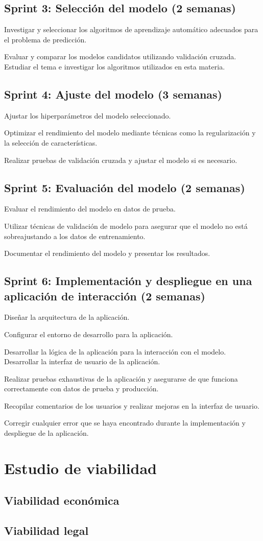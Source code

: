 \subsection{Sprint 3: Selección del modelo (2 semanas)}

Investigar y seleccionar los algoritmos de aprendizaje automático adecuados para el problema de predicción.

Evaluar y comparar los modelos candidatos utilizando validación cruzada.
Estudiar el tema e investigar los algoritmos utilizados en esta materia.

\subsection{Sprint 4: Ajuste del modelo (3 semanas)}

Ajustar los hiperparámetros del modelo seleccionado.

Optimizar el rendimiento del modelo mediante técnicas como la regularización y la selección de características.

Realizar pruebas de validación cruzada y ajustar el modelo si es necesario.

\subsection{Sprint 5: Evaluación del modelo (2 semanas)}
Evaluar el rendimiento del modelo en datos de prueba.

Utilizar técnicas de validación de modelo para asegurar que el modelo no está sobreajustando a los datos de entrenamiento.

Documentar el rendimiento del modelo y presentar los resultados.

\subsection{Sprint 6: Implementación y despliegue en una aplicación de interacción (2 semanas)}

Diseñar la arquitectura de la aplicación.

Configurar el entorno de desarrollo para la aplicación.

Desarrollar la lógica de la aplicación para la interacción con el modelo.
Desarrollar la interfaz de usuario de la aplicación.

Realizar pruebas exhaustivas de la aplicación y asegurarse de que funciona correctamente con datos de prueba y producción.

Recopilar comentarios de los usuarios y realizar mejoras en la interfaz de usuario.

Corregir cualquier error que se haya encontrado durante la implementación y despliegue de la aplicación.

\section{Estudio de viabilidad}

\subsection{Viabilidad económica}

\subsection{Viabilidad legal}


